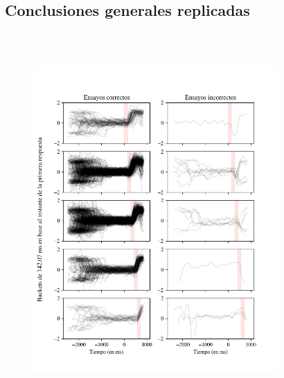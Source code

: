 \documentclass[aspectratio=169]{beamer}
\begin{document}
\subsection{Conclusiones generales replicadas}

\begin{frame}{~}
  \begin{columns}
    \begin{column}{0.5\textwidth}
      \begin{figure}
        \centering
        \includegraphics[width=\linewidth]{img/second-disaggregated-prosaccades.png}
      \end{figure}
    \end{column}
    \begin{column}{0.5\textwidth}
      \begin{figure}
        \centering

\end{figure}
\end{column}
\end{columns}
\end{frame}
\end{document}
